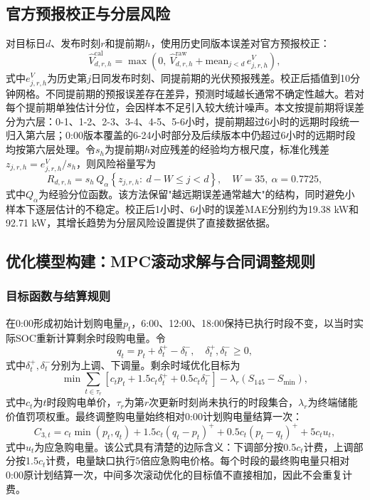 \subsection{官方预报校正与分层风险}
对目标日$d$、发布时刻$r$和提前期$h$，使用历史同版本误差对官方预报校正：
\begin{equation}
\hat{V}_{d,r,h}^{\mathrm{cal}}=\max\left(0,\ \hat{V}_{d,r,h}^{\mathrm{raw}}+\mathrm{mean}_{j<d}\,e_{j,r,h}^{V}\right),
\label{eq:q3_cal}
\end{equation}
式中$e_{j,r,h}^{V}$为历史第$j$日同发布时刻、同提前期的光伏预报残差。校正后插值到10分钟网格。不同提前期的预报误差存在差异，预测时域越长通常不确定性越大。若对每个提前期单独估计分位，会因样本不足引入较大统计噪声。本文按提前期将误差分为六层：0-1、1-2、2-3、3-4、4-5、5-6小时，提前期超过6小时的远期时段统一归入第六层；0:00版本覆盖的6-24小时部分及后续版本中仍超过6小时的远期时段均按第六层处理。令$s_h$为提前期$h$对应残差的经验均方根尺度，标准化残差$z_{j,r,h}=e_{j,r,h}^{V}/s_h$，则风险裕量写为
\begin{equation}
R_{d,r,h}=s_h\,Q_\alpha\left\{z_{j,r,h}:\ d-W\le j<d\right\},\quad W=35,\ \alpha=0.7725,
\label{eq:q3_risk}
\end{equation}
式中$Q_\alpha$为经验分位函数。该方法保留"越远期误差通常越大"的结构，同时避免小样本下逐层估计的不稳定。校正后1小时、6小时的误差MAE分别约为19.38 kW和92.71 kW，其增长趋势为分层风险设置提供了直接数据依据。

\subsection{优化模型构建：MPC滚动求解与合同调整规则}
\subsubsection{目标函数与结算规则}
在0:00形成初始计划购电量$p_t$，6:00、12:00、18:00保持已执行时段不变，以当时实际SOC重新计算剩余时段购电量。令
\begin{equation}
q_t=p_t+\delta_t^+-\delta_t^-,\quad \delta_t^+,\delta_t^-\ge0,
\label{eq:q3_qdef}
\end{equation}
式中$\delta_t^+,\delta_t^-$分别为上调、下调量。剩余时域优化目标为
\begin{equation}
\min \sum_{t\in\tau_r}\left[c_tp_t+1.5c_t\delta_t^++0.5c_t\delta_t^-\right]-\lambda_r(S_{145}-S_{\min}),
\label{eq:q3_obj}
\end{equation}
式中$c_t$为$t$时段购电单价，$\tau_r$为第$r$次更新时刻尚未执行的时段集合，$\lambda_r$为终端储能价值罚项权重。最终调整购电量始终相对0:00计划购电量结算一次：
\begin{equation}
C_{3,t}=c_t\min(p_t,q_t)+1.5c_t(q_t-p_t)^++0.5c_t(p_t-q_t)^++5c_tu_t,
\label{eq:q3_settle}
\end{equation}
式中$u_t$为应急购电量。该公式具有清楚的边际含义：下调部分按0.5$c_t$计费，上调部分按1.5$c_t$计费，电量缺口执行5倍应急购电价格。每个时段的最终购电量只相对0:00原计划结算一次，中间多次滚动优化的目标值不直接相加，因此不会重复计费。

